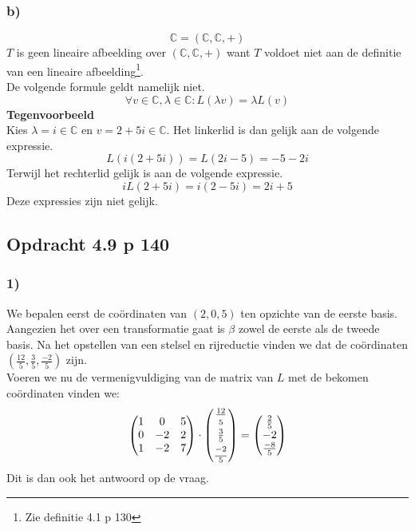 \documentclass[lineaire_algebra_oplossingen.tex]{subfiles}
\begin{document}
\subsubsection*{b)}
\[
\mathbb{C} = (\mathbb{C},\mathbb{C},+)
\]
$T$ is geen lineaire afbeelding over $(\mathbb{C},\mathbb{C},+)$ want $T$ voldoet niet aan de definitie van een lineaire afbeelding\footnote{Zie definitie 4.1 p 130}. \\
De volgende formule geldt namelijk niet.
\[\forall v\in \mathbb{C}, \lambda \in \mathbb{C}: L(\lambda v) = \lambda L(v)\]
\textbf{Tegenvoorbeeld}\\
Kies $\lambda = i \in \mathbb{C}$ en $v = 2+5i\in \mathbb{C}$.
Het linkerlid is dan gelijk aan de volgende expressie.
\[
L(i(2+5i)) = L(2i-5) = -5 -2i
\]
Terwijl het rechterlid gelijk is aan de volgende expressie.
\[
iL(2+5i) = i(2-5i) = 2i+5
\]
Deze expressies zijn niet gelijk.


\subsection{Opdracht 4.9 p 140}
\label{4.9}

\subsubsection*{1)}
We bepalen eerst de co\"ordinaten van $(2,0,5)$ ten opzichte van de eerste basis. Aangezien het over een transformatie gaat is $\beta$ zowel de eerste als de tweede basis. 
Na het opstellen van een stelsel en rijreductie vinden we dat de co\"ordinaten $\left(\frac{12}{5},\frac{3}{5},\frac{-2}{5}\right)$ zijn.\\
Voeren we nu de vermenigvuldiging van de matrix van $L$ met de bekomen co\"ordinaten vinden we:\\
\[
\begin{pmatrix}
1&0&5\\
0&-2&2\\
1&-2&7
\end{pmatrix}
\cdot
\begin{pmatrix}
\frac{12}{\strut5}\\ \frac{3}{5}\\ \frac{\strut -2}{5}
\end{pmatrix}
=
\begin{pmatrix}
\strut \frac{2}{5}\\ -2\\ \strut \frac{-8}{5}
\end{pmatrix}
\]
Dit is dan ook het antwoord op de vraag.
\end{document}
